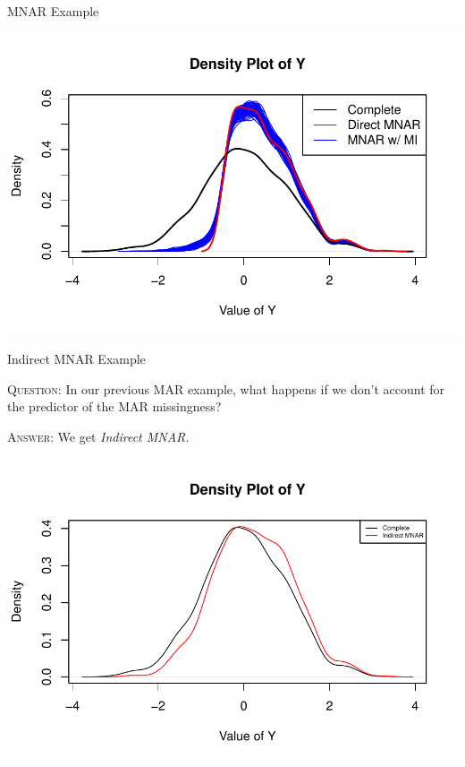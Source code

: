 \documentclass{beamer}
\begin{document}
\begin{frame}[allowframebreaks]{MNAR Example}
  



\includegraphics{sweaveFiles/lecture3-008}

\end{frame}


\begin{frame}[allowframebreaks]{Indirect MNAR Example}
  
  \textsc{Question:} In our previous MAR example, what happens if we don't account for the predictor of the MAR missingness?
    


\textsc{Answer:} We get \emph{Indirect MNAR.}


\includegraphics{sweaveFiles/lecture3-010}

\end{frame}
\end{document}
